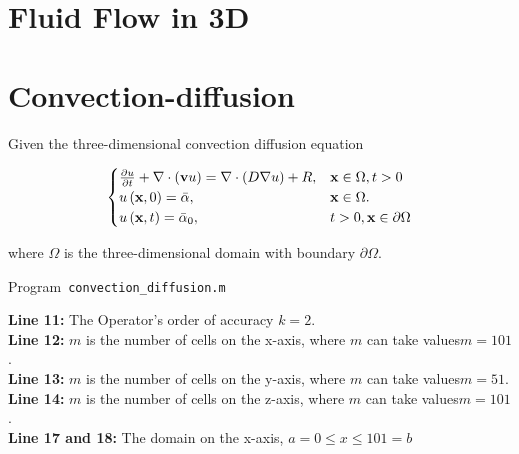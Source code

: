 \section{Fluid Flow in 3D}

\section{Convection-diffusion}
Given the three-dimensional convection diffusion equation

\begin{equation}\label{eq:IBVP3d}
	\begin{cases}
		\diffp{u}{t} + \nabla \cdot (\textbf{v} u) = \nabla \cdot (D \nabla u) + R,
		                                              & \textbf{x} \in \Omega, t > 0          \\
		u\left( \textbf{x},0\right)= \bar{\alpha},
		                                              & \textbf{x} \in  \Omega.               \\
		u\left(\textbf{x},t\right)= \bar{\alpha}_{0}, & t >0, \textbf{x} \in \partial  \Omega
	\end{cases}
\end{equation}

where  $\Omega$  is the three-dimensional domain with  boundary $\partial  \Omega $.

\begin{octavelisting}
	\tiny
	\centering
	\caption{Program~\texttt{convection\_diffusion.m}}
	\label{code:convection_diffusion.m}
\end{octavelisting}

\textbf{Line 11:} The Operator's order of accuracy $k = 2$.\\

\textbf{Line 12:} $m$ is the number of cells on the x-axis, where $m$ can take values ​​$m= 101$.\\

\textbf{Line 13:} $m$ is the number of cells on the y-axis, where $m$ can take values ​​$m= 51$.\\

\textbf{Line 14:} $m$ is the number of cells on the z-axis, where $m$ can take values ​​$m= 101$.\\

\textbf{Line 17 and 18:} The domain on the  x-axis, $a=0 \leq x \leq 101=b$\\

